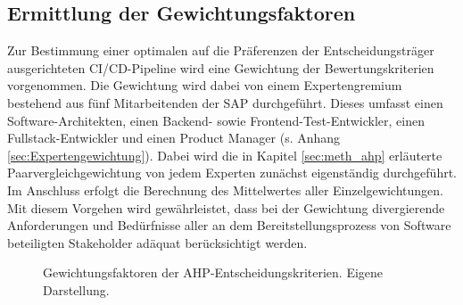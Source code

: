 \subsection{Ermittlung der Gewichtungsfaktoren}
\label{sec:Gewichtung}
Zur Bestimmung einer optimalen auf die Präferenzen der Entscheidungsträger ausgerichteten CI/CD-Pipeline wird eine Gewichtung der Bewertungskriterien vorgenommen. Die Gewichtung wird dabei von einem Expertengremium bestehend aus fünf Mitarbeitenden der SAP durchgeführt. Dieses umfasst einen Software-Architekten, einen Backend- sowie Frontend-Test-Entwickler, einen Fullstack-Entwickler und einen Product Manager (s. Anhang \ref{sec:Expertengewichtung}). Dabei wird die in Kapitel \ref{sec:meth_ahp} erläuterte Paarvergleichgewichtung von jedem Experten zunächst eigenständig durchgeführt. Im Anschluss erfolgt die Berechnung des Mittelwertes aller Einzelgewichtungen. Mit diesem Vorgehen wird gewährleistet, dass bei der Gewichtung divergierende Anforderungen und Bedürfnisse aller an dem Bereitstellungsprozess von Software beteiligten Stakeholder adäquat berücksichtigt werden.   
\begin{center}
	\begin{figure}[H]
		\centering
		\caption[Gewichtungsfaktoren der AHP-Entscheidungskriterien]{Gewichtungsfaktoren der AHP-Entscheidungskriterien. Eigene Darstellung.}
		\label{fig:AHP_G}
	\end{figure}
\end{center}
\vspace*{-15mm}
